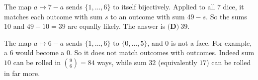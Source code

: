 The map $a\mapsto7-a$ sends $\{1,\dots,6\}$ to itself bijectively. Applied to all $7$ dice, it matches each outcome with sum $s$ to an outcome with sum $49-s$. So the sums $10$ and $49-10=39$ are equally likely. The answer is $\boxed{\textbf{(D)}\ 39}$.

The map $a\mapsto6-a$ sends $\{1,\dots,6\}$ to $\{0,\dots,5\}$, and $0$ is not a face. For example, a $6$ would become a $0$. So it does not match outcomes with outcomes. Indeed sum $10$ can be rolled in $\binom96=84$ ways, while sum $32$ (equivalently $17$) can be rolled in far more.
